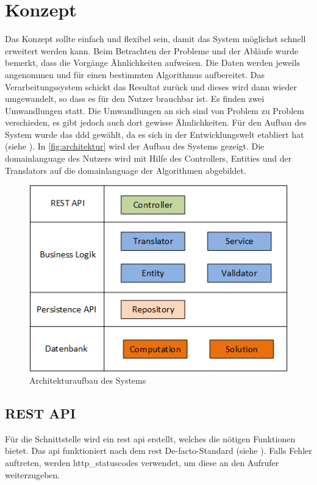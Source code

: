 \section{Konzept}\label{arch_backend}
Das Konzept sollte einfach und flexibel sein, damit das System möglichst schnell erweitert werden kann. Beim Betrachten der Probleme und der Abläufe wurde bemerkt, dass die Vorgänge 
Ähnlichkeiten aufweisen. Die Daten werden jeweils angenommen und für einen bestimmten Algorithmus aufbereitet. Das Verarbeitungssystem schickt das Resultat zurück und dieses wird dann 
wieder umgewandelt, so dass es für den Nutzer brauchbar ist. Es finden zwei Umwandlungen statt. Die Umwandlungen an sich sind von Problem zu Problem verschieden, es gibt jedoch 
auch dort gewisse Ähnlichkeiten. Für den Aufbau des System wurde das \gls{ddd} gewählt, da es sich in der Entwicklungswelt etabliert hat (siehe \cite{evans2004domain} 
\cite{soft_arch_book}). In \autoref{fig:architektur} wird der Aufbau des Systems gezeigt. Die  \gls{domainlanguage} des Nutzers wird mit Hilfe des Controllers, Entities und der Translators auf 
die \gls{domainlanguage} der Algorithmen abgebildet.

\begin{figure}[h]
\centering
\includegraphics[scale=0.8]{images/visio/architektur_db.png}
\caption[Architekturaufbau des Systems]{Architekturaufbau des Systems \selfmade{}}
\label{fig:architektur}
\end{figure}
 
\FloatBarrier
\subsection{REST API}
Für die Schnittstelle wird ein \gls{rest} \gls{api} erstellt, welches die nötigen Funktionen bietet. Das \gls{api} funktioniert nach dem \gls{rest} De-facto-Standard 
(siehe \cite{masse2011rest}). Falls Fehler auftreten, werden \glspl{http_statuscode} verwendet, um diese an den Aufrufer weiterzugeben.

